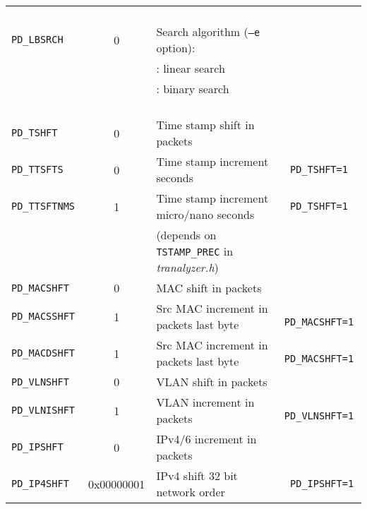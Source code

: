 \documentclass[documentation]{subfiles}
\begin{document}
\begin{longtable}{>{\tt}lcl>{\tt\small}l}
                  &                    &                                                                                  & \\
    PD\_LBSRCH    & 0                  & Search algorithm ({\small\tt --e} option):                                       & \\
                  &                    & \qquad 0: linear search                                                          & \\
                  &                    & \qquad 1: binary search                                                          & \\
                  &                    &                                                                                  & \\
    PD\_TSHFT     & 0                  & Time stamp shift in packets                                                      & \\
    PD\_TTSFTS    & 0                  & Time stamp increment seconds                                                     & PD\_TSHFT=1\\
    PD\_TTSFTNMS  & 1                  & Time stamp increment micro/nano seconds                                          & PD\_TSHFT=1\\
                  &                    & \qquad (depends on {\small\tt TSTAMP\_PREC} in {\em tranalyzer.h})               & \\
    PD\_MACSHFT   & 0                  & MAC shift in packets                                                             & \\
    PD\_MACSSHFT  & 1                  & Src MAC increment in packets last byte                                           & PD\_MACSHFT=1\\
    PD\_MACDSHFT  & 1                  & Src MAC increment in packets last byte                                           & PD\_MACSHFT=1\\
    PD\_VLNSHFT   & 0                  & VLAN shift in packets                                                            & \\
    PD\_VLNISHFT  & 1                  & VLAN increment in packets                                                        & PD\_VLNSHFT=1\\
    PD\_IPSHFT    & 0                  & IPv4/6 increment in packets                                                      & \\
    PD\_IP4SHFT   & 0x00000001         & IPv4 shift 32 bit network order                                                  & PD\_IPSHFT=1\\

\end{longtable}
\end{document}
